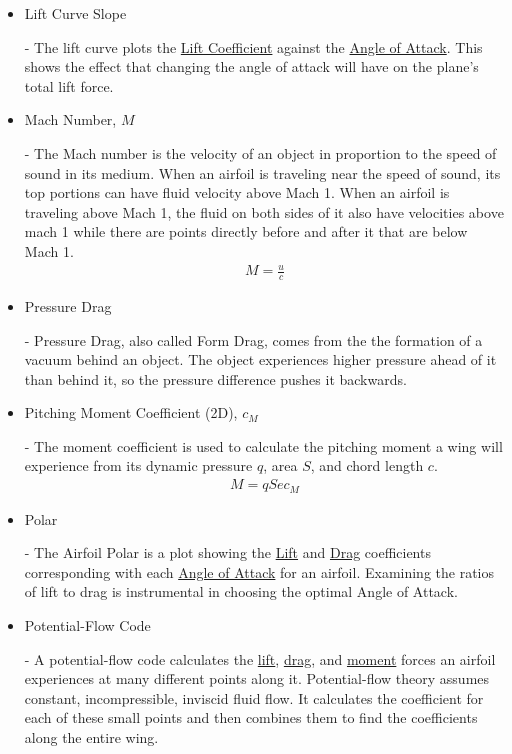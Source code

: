 \documentclass{article}
\begin{document}
\begin{itemize}
	\item \hypertarget{LC}{Lift Curve Slope} - The lift curve plots the \hyperlink{CL}{Lift Coefficient} against the \hyperlink{alpha}{Angle of Attack}. This shows the effect that changing the angle of attack will have on the plane's total lift force.
		
	\item \hypertarget{M}{Mach Number, $M$} - The Mach number is the velocity of an object in proportion to the speed of sound in its medium. When an airfoil is traveling near the speed of sound, its top portions can have fluid velocity above Mach 1. When an airfoil is traveling above Mach 1, the fluid on both sides of it also have velocities above mach 1 while there are points directly before and after it that are below Mach 1.
		\begin{equation} \label{eq:15}
		\begin{aligned}
        			M = \frac{u}{c}
	    	\end{aligned}
		\end{equation}
		
	\item \hypertarget{DP}{Pressure Drag} - Pressure Drag, also called Form Drag, comes from the the formation of a vacuum behind an object. The object experiences higher pressure ahead of it than behind it, so the pressure difference pushes it backwards.
		
	\item \hypertarget{CM}{Pitching Moment Coefficient (2D), $c_{M}$} - The moment coefficient is used to calculate the pitching moment a wing will experience from its dynamic pressure $q$, area $S$, and chord length $c$.
		\begin{equation} \label{eq:16}
		\begin{aligned}
        			M = q S e c_{M}
	    	\end{aligned}
		\end{equation}

	\item \hypertarget{AP}{Polar} - The Airfoil Polar is a plot showing the  \hyperlink{CL}{Lift} and  \hyperlink{CD}{Drag} coefficients corresponding with each \hyperlink{alpha}{Angle of Attack} for an airfoil. Examining the ratios of lift to drag is instrumental in choosing the optimal Angle of Attack.
	
	\item \hypertarget{PFC}{Potential-Flow Code} - A potential-flow code calculates the \hyperlink{CL}{lift}, \hyperlink{CD}{drag}, and \hyperlink{CM}{moment} forces an airfoil experiences at many different points along it. Potential-flow theory assumes constant, incompressible, inviscid fluid flow. It calculates the coefficient for each of these small points and then combines them to find the coefficients along the entire wing.
	

\end{itemize}
\end{document}
